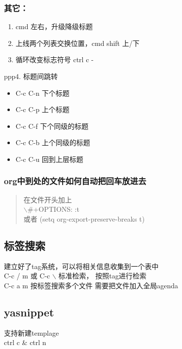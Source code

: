 \documentclass[11pt]{article}
\begin{document}
\subsubsection{其它：}
\label{sec:org1f62735}
\begin{enumerate}
\item cmd 左右，升级降级标题\\
\item 上线两个列表交换位置，cmd shift 上/下\\
\item 循环改变标志符号 ctrl c -\\
\end{enumerate}
ppp4. 标题间跳转\\
\begin{itemize}
\item C-c C-n	下个标题\\
\item C-c C-p	上个标题\\
\item C-c C-f	下个同级的标题\\
\item C-c C-b	上个同级的标题\\
\item C-c C-u	回到上层标题\\
\end{itemize}

\subsubsection{org中到处的文件如何自动把回车放进去}
\label{sec:orgb14d545}
\begin{quote}
在文件开头加上\\
$\backslash$#+OPTIONS: \n:t\\
或者 (setq org-export-preserve-breaks t)\\
\end{quote}
\subsection{标签搜索}
\label{sec:orga21c378}

建立好了tag系统，可以将相关信息收集到一个表中\\

C-c / m 或 C-c $\backslash$ 标准检索， 按照tag进行检索\\
C-c a m 按标签搜索多个文件 需要把文件加入全局agenda\\

\subsection{yasnippet}
\label{sec:org653986d}
支持新建templage\\
ctrl c \& ctrl n\\
\end{document}

